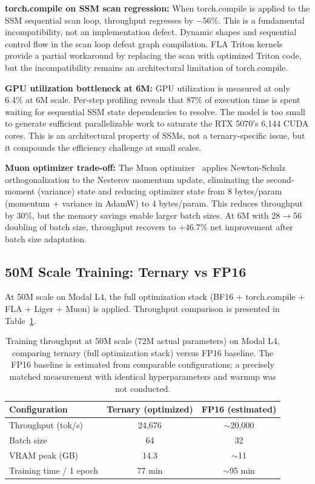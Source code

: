 \documentclass{article}
\begin{document}
\textbf{torch.compile on SSM scan regression:} When torch.compile is applied to the SSM sequential scan loop, throughput regresses by $-$56\%. This is a fundamental incompatibility, not an implementation defect. Dynamic shapes and sequential control flow in the scan loop defeat graph compilation. FLA Triton kernels provide a partial workaround by replacing the scan with optimized Triton code, but the incompatibility remains an architectural limitation of torch.compile.

\textbf{GPU utilization bottleneck at 6M:} GPU utilization is measured at only 6.4\% at 6M scale. Per-step profiling reveals that 87\% of execution time is spent waiting for sequential SSM state dependencies to resolve. The model is too small to generate sufficient parallelizable work to saturate the RTX 5070's 6{,}144 CUDA cores. This is an architectural property of SSMs, not a ternary-specific issue, but it compounds the efficiency challenge at small scales.

\textbf{Muon optimizer trade-off:} The Muon optimizer~\citep{jordan2024muon} applies Newton-Schulz orthogonalization to the Nesterov momentum update, eliminating the second-moment (variance) state and reducing optimizer state from 8 bytes/param (momentum + variance in AdamW) to 4 bytes/param. This reduces throughput by 30\%, but the memory savings enable larger batch sizes. At 6M with 28$\to$56 doubling of batch size, throughput recovers to $+$46.7\% net improvement after batch size adaptation.

\subsection{50M Scale Training: Ternary vs FP16}

At 50M scale on Modal L4, the full optimization stack (BF16 + torch.compile + FLA + Liger + Muon) is applied. Throughput comparison is presented in Table~\ref{tab:scale50m}.

\begin{table}[t]
\centering
\small
\caption{Training throughput at 50M scale (72M actual parameters) on Modal L4, comparing ternary (full optimization stack) versus FP16 baseline. The FP16 baseline is estimated from comparable configurations; a precisely matched measurement with identical hyperparameters and warmup was not conducted.}
\label{tab:scale50m}
\begin{tabular}{lcc}
\toprule
\textbf{Configuration} & \textbf{Ternary (optimized)} & \textbf{FP16 (estimated)} \\
\midrule
Throughput (tok/s) & 24{,}676 & $\sim$20{,}000 \\
Batch size & 64 & 32 \\
VRAM peak (GB) & 14.3 & $\sim$11 \\
Training time / 1 epoch & 77 min & $\sim$95 min \\
\bottomrule
\end{tabular}
\end{table}
\end{document}
